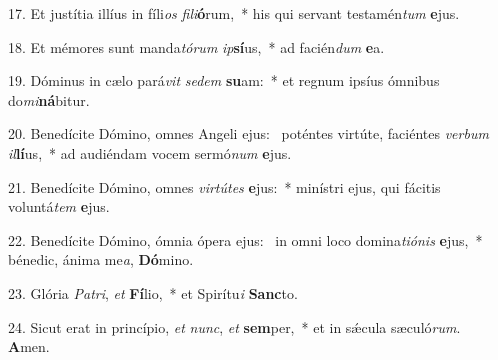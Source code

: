 17. Et justítia illíus in fíli\textit{os} \textit{fi}\textit{li}\textbf{ó}rum,~*  his qui servant testamén\textit{tum} \textbf{e}jus.\

18. Et mémores sunt manda\textit{tó}\textit{rum} \textit{ip}\textbf{sí}us,~*  ad facién\textit{dum} \textbf{e}a.\

19. Dóminus in cælo pará\textit{vit} \textit{se}\textit{dem} \textbf{su}am:~*  et regnum ipsíus ómnibus do\textit{mi}\textbf{ná}bitur.\

20. Benedícite Dómino, omnes Angeli ejus: \dag\  poténtes virtúte, faciéntes \textit{ver}\textit{bum} \textit{il}\textbf{lí}us,~*  ad audiéndam vocem sermó\textit{num} \textbf{e}jus.\

21. Benedícite Dómino, omnes \textit{vir}\textit{tú}\textit{tes} \textbf{e}jus:~*  minístri ejus, qui fácitis voluntá\textit{tem} \textbf{e}jus.\

22. Benedícite Dómino, ómnia ópera ejus: \dag\  in omni loco domina\textit{ti}\textit{ó}\textit{nis} \textbf{e}jus,~*  bénedic, ánima me\textit{a}, \textbf{Dó}mino.\

23. Glória \textit{Pa}\textit{tri}, \textit{et} \textbf{Fí}lio,~*  et Spirítu\textit{i} \textbf{Sanc}to.\

24. Sicut erat in princípio, \textit{et} \textit{nunc}, \textit{et} \textbf{sem}per,~*  et in sǽcula sæculó\textit{rum}. \textbf{A}men.\

